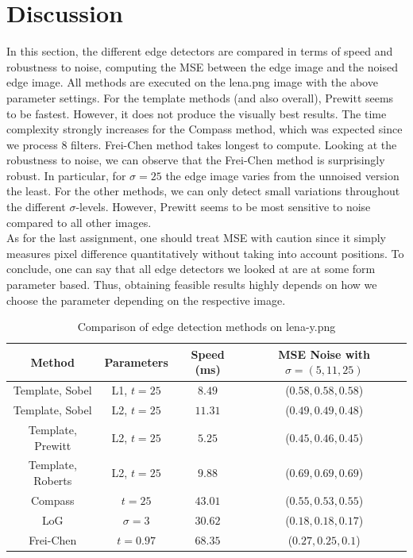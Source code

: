 \documentclass{article}
\begin{document}
\section{Discussion}\label{sec:discussion}
In this section, the different edge detectors are compared in terms of speed and robustness to noise, computing the MSE between the edge image and the noised edge image. All methods are executed on the \textsf{lena.png} image with the above parameter settings. For the template methods (and also overall), Prewitt seems to be fastest. However, it does not produce the visually best results. The time complexity strongly increases for the Compass method, which was expected since we process $8$ filters. Frei-Chen method takes longest to compute. Looking at the robustness to noise, we can observe that the Frei-Chen method is surprisingly robust. In particular, for $\sigma = 25$ the edge image varies from the unnoised version the least. For the other methods, we can only detect small variations throughout the different $\sigma$-levels. However, Prewitt seems to be most sensitive to noise compared to all other images. \\
As for the last assignment, one should treat MSE with caution since it simply measures pixel difference quantitatively without taking into account positions. To conclude, one can say that all edge detectors we looked at are at some form parameter based. Thus, obtaining feasible results highly depends on how we choose the parameter depending on the respective image.

\begin{table}
\centering
\caption{Comparison of edge detection methods on lena-y.png}
\begin{tabular}{ c || c| c | c}
 Method & Parameters & Speed (ms) & MSE Noise with $\sigma=(5, 11, 25)$ \\ 
 \hline
 Template, Sobel & L1, $t=25$ & $8.49$ & ($0.58, 0.58, 0.58$) \\
 Template, Sobel & L2, $t=25$ & $11.31$ & ($0.49, 0.49, 0.48$)\\
 Template, Prewitt & L2, $t=25$ & $5.25$ & ($0.45, 0.46, 0.45$)\\
 Template, Roberts & L2, $t=25$ & $9.88$ & ($0.69, 0.69, 0.69$)\\
 Compass &  $t=25$ & $43.01$ & ($0.55, 0.53, 0.55$)\\
 LoG & $\sigma = 3$ & $30.62$ & ($0.18, 0.18, 0.17$) \\
 Frei-Chen & $t=0.97$ & $68.35$ & ($0.27, 0.25, 0.1$)\\
\end{tabular}
\label{tab:1}
\end{table}
\end{document}
